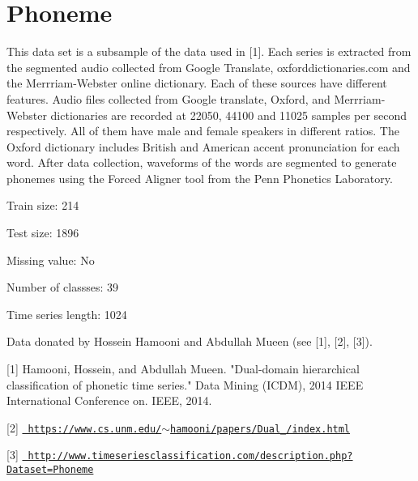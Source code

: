 \chapter{Phoneme}
\hypertarget{md_external_2data_2UCRArchive__2018_2Phoneme_2README}{}\label{md_external_2data_2UCRArchive__2018_2Phoneme_2README}
\label{md_external_2data_2UCRArchive__2018_2Phoneme_2README_autotoc_md161}%
%
 This data set is a subsample of the data used in \mbox{[}1\mbox{]}. Each series is extracted from the segmented audio collected from Google Translate, oxforddictionaries.\+com and the Merrriam-\/\+Webster online dictionary. Each of these sources have different features. Audio files collected from Google translate, Oxford, and Merrriam-\/\+Webster dictionaries are recorded at 22050, 44100 and 11025 samples per second respectively. All of them have male and female speakers in different ratios. The Oxford dictionary includes British and American accent pronunciation for each word. After data collection, waveforms of the words are segmented to generate phonemes using the Forced Aligner tool from the Penn Phonetics Laboratory.

Train size\+: 214

Test size\+: 1896

Missing value\+: No

Number of classses\+: 39

Time series length\+: 1024

Data donated by Hossein Hamooni and Abdullah Mueen (see \mbox{[}1\mbox{]}, \mbox{[}2\mbox{]}, \mbox{[}3\mbox{]}).

\mbox{[}1\mbox{]} Hamooni, Hossein, and Abdullah Mueen. "{}\+Dual-\/domain hierarchical classification of phonetic time series."{} Data Mining (ICDM), 2014 IEEE International Conference on. IEEE, 2014.

\mbox{[}2\mbox{]} \href{https://www.cs.unm.edu/~hamooni/papers/Dual_2014/index.html}{\texttt{ https\+://www.\+cs.\+unm.\+edu/\texorpdfstring{$\sim$}{\string~}hamooni/papers/\+Dual\+\_/index.\+html}}

\mbox{[}3\mbox{]} \href{http://www.timeseriesclassification.com/description.php?Dataset=Phoneme}{\texttt{ http\+://www.\+timeseriesclassification.\+com/description.\+php?\+Dataset=\+Phoneme}} 